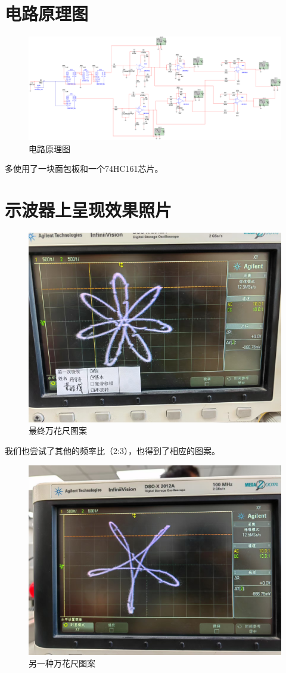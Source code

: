 \section{电路原理图}
\begin{figure}[H]
    \centering
    \includegraphics[width=1.2\linewidth,angle=-90]{images/circuit-full.png}
    \caption{电路原理图}
\end{figure}
多使用了一块面包板和一个74HC161芯片。



\section{示波器上呈现效果照片}
\begin{figure}[H]
    \centering
    \includegraphics[width=0.6\linewidth]{images/result.jpg}
    \caption{最终万花尺图案}
\end{figure}
我们也尝试了其他的频率比（2:3），也得到了相应的图案。
\begin{figure}[H]
    \centering
    \includegraphics[width=0.6\linewidth]{images/result2.jpg}
    \caption{另一种万花尺图案}
\end{figure}



